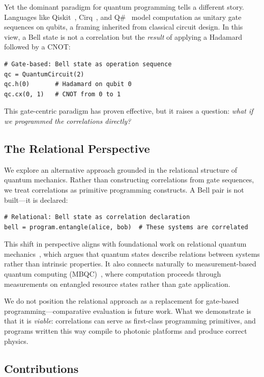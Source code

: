 \documentclass[submission,copyright,creativecommons]{eptcs}
\newcommand{\mbqc}{\textsc{MBQC}}
\begin{document}
Yet the dominant paradigm for quantum programming tells a different
story. Languages like Qiskit~\cite{qiskit}, Cirq~\cite{cirq},
and Q\#~\cite{qsharp} model computation as unitary gate sequences
on qubits, a framing inherited from classical circuit design.
In this view, a Bell state is not a correlation but the
\emph{result} of applying a Hadamard followed by a CNOT:

\begin{lstlisting}
# Gate-based: Bell state as operation sequence
qc = QuantumCircuit(2)
qc.h(0)       # Hadamard on qubit 0
qc.cx(0, 1)   # CNOT from 0 to 1
\end{lstlisting}

This gate-centric paradigm has proven effective, but it raises a question:
\emph{what if we programmed the correlations directly?}

\subsection{The Relational Perspective}

We explore an alternative approach grounded in the relational structure of
quantum mechanics. Rather than constructing correlations from gate sequences,
we treat correlations as primitive programming constructs. A Bell pair is not
built---it is declared:

\begin{lstlisting}
# Relational: Bell state as correlation declaration
bell = program.entangle(alice, bob)  # These systems are correlated
\end{lstlisting}

This shift in perspective aligns with foundational work on relational quantum
mechanics~\cite{rovelli1996}, which argues that quantum states describe
relations between systems rather than intrinsic properties. It also connects
naturally to measurement-based quantum computing (\mbqc{})~\cite{raussendorf2001},
where computation proceeds through measurements on entangled resource states
rather than gate application.

We do not position the relational approach as a replacement for
gate-based programming---comparative evaluation is future work. What we
demonstrate is that it is \emph{viable}: correlations can serve as
first-class programming primitives, and programs written this way
compile to photonic platforms and produce correct physics.

\subsection{Contributions}
\end{document}
